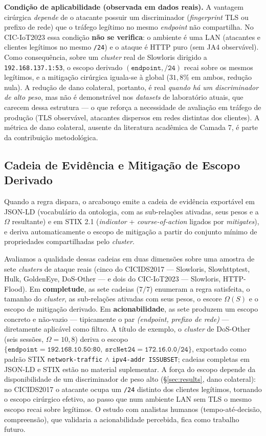 \documentclass[preprint,12pt]{elsarticle}
\begin{document}
\textbf{Condição de aplicabilidade (observada em dados reais).} A vantagem cirúrgica \emph{depende} de o atacante possuir um discriminador (\emph{fingerprint} TLS ou prefixo de rede) que o tráfego legítimo no mesmo \emph{endpoint} não compartilha. No CIC-IoT2023 essa condição \textbf{não se verifica}: o ambiente é uma LAN (atacantes e clientes legítimos no mesmo \texttt{/24}) e o ataque é HTTP puro (sem JA4 observável). Como consequência, sobre um \emph{cluster} real de Slowloris dirigido a \texttt{192.168.137.1:53}, o escopo derivado $(\texttt{endpoint}, \texttt{/24})$ recai sobre os mesmos legítimos, e a mitigação cirúrgica iguala-se à global ($31{,}8\%$ em ambos, redução nula). A redução de dano colateral, portanto, é real \emph{quando há um discriminador de alto peso}, mas não é demonstrável nos \emph{datasets} de laboratório atuais, que carecem dessa estrutura --- o que reforça a necessidade de avaliação em tráfego de produção (TLS observável, atacantes dispersos em redes distintas dos clientes). A métrica de dano colateral, ausente da literatura acadêmica de Camada 7, é parte da contribuição metodológica.

\subsection{Cadeia de Evidência e Mitigação de Escopo Derivado}

Quando a regra dispara, o arcabouço emite a cadeia de evidência exportável em JSON-LD (vocabulário da ontologia, com as sub-relações ativadas, seus pesos e a $\Omega$ resultante) e em STIX 2.1 (\emph{indicator} + \emph{course-of-action} ligados por \emph{mitigates}), e deriva automaticamente o escopo de mitigação a partir do conjunto mínimo de propriedades compartilhadas pelo \emph{cluster}.

Avaliamos a qualidade dessas cadeias em duas dimensões sobre uma amostra de sete \emph{clusters} de ataque reais (cinco do CICIDS2017 --- Slowloris, Slowhttptest, Hulk, GoldenEye, DoS-Other --- e dois do CIC-IoT2023 --- Slowloris, HTTP-Flood). Em \textbf{completude}, as sete cadeias ($7/7$) enumeram a regra satisfeita, o tamanho do \emph{cluster}, as sub-relações ativadas com seus pesos, o escore $\Omega(S)$ e o escopo de mitigação derivado. Em \textbf{acionabilidade}, as sete produzem um escopo concreto e não-vazio --- tipicamente o par \emph{(endpoint, prefixo de rede)} --- diretamente aplicável como filtro. A título de exemplo, o \emph{cluster} de DoS-Other (seis sessões, $\Omega = 10{,}8$) deriva o escopo $\{\texttt{endpoint}=\texttt{192.168.10.50:80},\ \texttt{srcNet24}=\texttt{172.16.0.0/24}\}$, exportado como padrão STIX \texttt{network-traffic} $\wedge$ \texttt{ipv4-addr ISSUBSET}; cadeias completas em JSON-LD e STIX estão no material suplementar. A força do escopo depende da disponibilidade de um discriminador de peso alto (§\ref{sec:results}, dano colateral): no CICIDS2017 o atacante ocupa um \texttt{/24} distinto dos clientes legítimos, tornando o escopo cirúrgico efetivo, ao passo que num ambiente LAN sem TLS o mesmo escopo recai sobre legítimos. O estudo com analistas humanos (tempo-até-decisão, compreensão), que validaria a acionabilidade percebida, fica como trabalho futuro.
\end{document}
